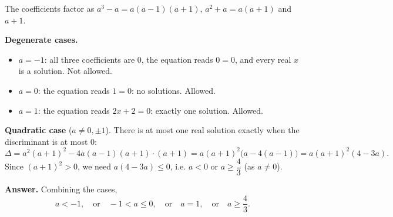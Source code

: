 The coefficients factor as $a^3-a=a(a-1)(a+1)$, $a^2+a=a(a+1)$ and $a+1$.

\textbf{Degenerate cases.}
\begin{itemize}
\item $a=-1$: all three coefficients are $0$, the equation reads $0=0$, and every real $x$ is a solution. Not allowed.
\item $a=0$: the equation reads $1=0$: no solutions. Allowed.
\item $a=1$: the equation reads $2x+2=0$: exactly one solution. Allowed.
\end{itemize}

\textbf{Quadratic case} ($a\ne0,\pm1$). There is at most one real solution exactly when the discriminant is at most $0$:
\[\Delta=a^2(a+1)^2-4a(a-1)(a+1)\cdot(a+1)=a(a+1)^2\bigl(a-4(a-1)\bigr)=a(a+1)^2(4-3a).\]
Since $(a+1)^2>0$, we need $a(4-3a)\le0$, i.e. $a<0$ or $a\ge\dfrac43$ (as $a\ne0$).

\textbf{Answer.} Combining the cases,
\[\boxed{a<-1,\quad\text{or}\quad-1<a\le0,\quad\text{or}\quad a=1,\quad\text{or}\quad a\ge\dfrac43}.\]

